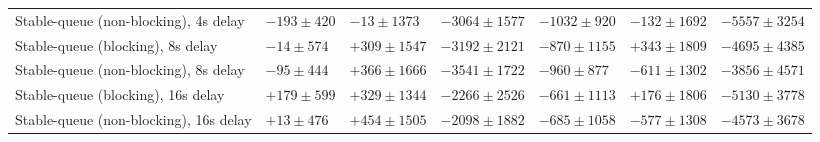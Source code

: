 \begin{table}[H]
{\begin{tabular}{l w{c}{5.0em} w{c}{5.0em} w{c}{5.0em} w{c}{5.0em} w{c}{5.0em} w{c}{5.0em}}
Stable-queue (non-blocking), 4s delay & $-193\pm420$ & $-13\pm1373$ & $-3064\pm1577$ & $-1032\pm920$ & $-132\pm1692$ & $-5557\pm3254$ \\
Stable-queue (blocking), 8s delay & $-14\pm574$ & $+309\pm1547$ & $-3192\pm2121$ & $-870\pm1155$ & $+343\pm1809$ & $-4695\pm4385$ \\
Stable-queue (non-blocking), 8s delay & $-95\pm444$ & $+366\pm1666$ & $-3541\pm1722$ & $-960\pm877$ & $-611\pm1302$ & $-3856\pm4571$ \\
Stable-queue (blocking), 16s delay & $+179\pm599$ & $+329\pm1344$ & $-2266\pm2526$ & $-661\pm1113$ & $+176\pm1806$ & $-5130\pm3778$ \\
Stable-queue (non-blocking), 16s delay & $+13\pm476$ & $+454\pm1505$ & $-2098\pm1882$ & $-685\pm1058$ & $-577\pm1308$ & $-4573\pm3678$ \\
\bottomrule
\end{tabular}%
}
\end{table}
